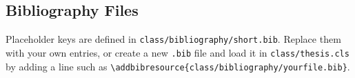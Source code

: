 \subsection{Bibliography Files}

Placeholder keys are defined in \texttt{class/bibliography/short.bib}. Replace them with your own entries, or create a new \texttt{.bib} file and load it in \texttt{class/thesis.cls} by adding a line such as \texttt{\textbackslash addbibresource\{class/bibliography/yourfile.bib\}}.

